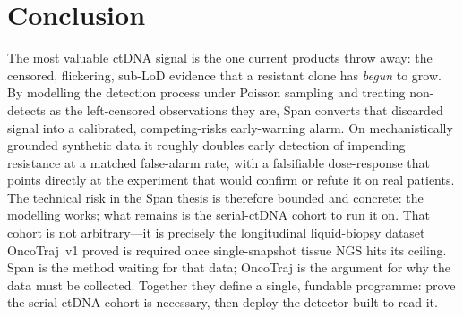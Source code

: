 \documentclass[11pt]{article}
\newcommand{\1}{\mathbf{1}}
\begin{document}
\section{Conclusion}
The most valuable ctDNA signal is the one current products throw away: the
censored, flickering, sub-LoD evidence that a resistant clone has \emph{begun}
to grow. By modelling the detection process under Poisson sampling and treating
non-detects as the left-censored observations they are, Span converts that
discarded signal into a calibrated, competing-risks early-warning alarm. On
mechanistically grounded synthetic data it roughly doubles early detection of
impending resistance at a matched false-alarm rate, with a falsifiable
dose-response that points directly at the experiment that would confirm or refute
it on real patients. The technical risk in the Span thesis is therefore bounded
and concrete: the modelling works; what remains is the serial-ctDNA cohort to run
it on. That cohort is not arbitrary---it is precisely the longitudinal
liquid-biopsy dataset OncoTraj~v1 \citep{sarkar2026oncotraj} proved is required
once single-snapshot tissue NGS hits its ceiling. Span is the method waiting for
that data; OncoTraj is the argument for why the data must be collected. Together
they define a single, fundable programme: prove the serial-ctDNA cohort is
necessary, then deploy the detector built to read it.
\end{document}
